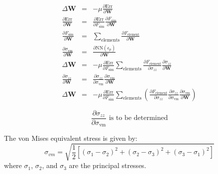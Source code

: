 \begin{eqnarray}    
\Delta \mathbf{W} &=& -\mu \frac{\partial \text{Err}}{\partial \mathbf{W}} \\
\frac{\partial \text{Err}}{\partial \mathbf{W}} &=& \frac{\partial \text{Err}}{\partial F_{\text{sim}}} \frac{\partial F_{\text{sim}}}{\partial \mathbf{W}} \\
\frac{\partial F_{\text{sim}}}{\partial \mathbf{W}} &=& \sum_{\text{elements}} \frac{\partial F_{\text{element}}}{\partial \mathbf{W}} \\
\frac{\partial \sigma_{\text{vm}}}{\partial \mathbf{W}} &=& \frac{\partial \text{NN}(\epsilon_p)}{\partial \mathbf{W}} \\
\Delta \mathbf{W} &=& -\mu \frac{\partial \text{Err}}{\partial F_{\text{sim}}} \sum_{\text{elements}} \frac{\partial F_{\text{element}}}{\partial \sigma_{zz}} \frac{\partial \sigma_{zz}}{\partial \mathbf{W}} \\
\frac{\partial \sigma_{zz}}{\partial \mathbf{W}} &=& \frac{\partial \sigma_{zz}}{\partial \sigma_{\text{vm}}} \frac{\partial \sigma_{\text{vm}}}{\partial \mathbf{W}} \\
\Delta \mathbf{W} &=& -\mu \frac{\partial \text{Err}}{\partial F_{\text{sim}}} \sum_{\text{elements}} \left( \frac{\partial F_{\text{element}}}{\partial \sigma_{zz}} \frac{\partial \sigma_{zz}}{\partial \sigma_{\text{vm}}} \frac{\partial \sigma_{\text{vm}}}{\partial \mathbf{W}} \right)
\end{eqnarray}

\begin{equation}
\frac{\partial \sigma_{zz}}{\partial \sigma_{\text{vm}}} \text{ is to be determined}
\end{equation}

The von Mises equivalent stress is given by:
\begin{equation}
\sigma_{vm} = \sqrt{\frac{1}{2} \left[ (\sigma_1 - \sigma_2)^2 + (\sigma_2 - \sigma_3)^2 + (\sigma_3 - \sigma_1)^2 \right]}
\end{equation}
where $\sigma_1$, $\sigma_2$, and $\sigma_3$ are the principal stresses.
